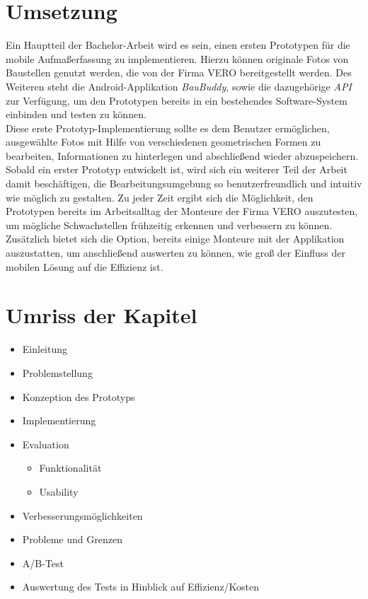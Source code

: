 \documentclass[a4paper]{article}
\newcommand{\vero}{\textsc{VERO}}
\begin{document}
\section*{Umsetzung}
Ein Hauptteil der Bachelor-Arbeit wird es sein, einen ersten Prototypen für die mobile Aufmaßerfassung zu implementieren.
Hierzu können originale Fotos von Baustellen genutzt werden, die von der Firma \vero{} bereitgestellt werden.
Des Weiteren steht die Android-Applikation \textit{BauBuddy}, sowie die dazugehörige \textit{API} zur Verfügung, um den Prototypen bereits in ein bestehendes Software-System einbinden und testen zu können. \\
Diese erste Prototyp-Implementierung sollte es dem Benutzer ermöglichen, ausgewählte Fotos mit Hilfe von verschiedenen geometrischen Formen zu bearbeiten, Informationen zu hinterlegen und abschließend wieder abzuspeichern.
Sobald ein erster Prototyp entwickelt ist, wird sich ein weiterer Teil der Arbeit damit beschäftigen, die Bearbeitungsumgebung so benutzerfreundlich und intuitiv wie möglich zu gestalten.
Zu jeder Zeit ergibt sich die Möglichkeit, den Prototypen bereits im Arbeitsalltag der Monteure der Firma \vero{} auszutesten, um mögliche Schwachstellen frühzeitig erkennen und verbessern zu können.
Zusätzlich bietet sich die Option, bereits einige Monteure mit der Applikation auszustatten, um anschließend auswerten zu können, wie groß der Einfluss der mobilen Lösung auf die Effizienz ist.

\section*{Umriss der Kapitel}
\begin{itemize}
    \item Einleitung 
    \item Problemstellung
    \item Konzeption des Prototyps
    \item Implementierung
    \item Evaluation
        \begin{itemize}
            \item Funktionalität
            \item Usability
        \end{itemize}
    \item Verbesserungsmöglichkeiten
    \item Probleme und Grenzen
    \item A/B-Test
    \item Auswertung des Tests in Hinblick auf Effizienz/Kosten
\end{itemize}
\end{document}

